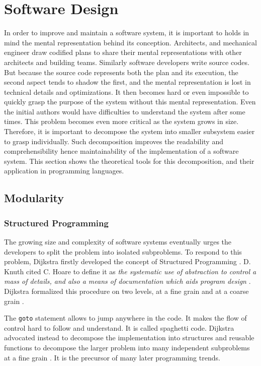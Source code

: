 \section{Software Design} \label{chapter3:software-design}

In order to improve and maintain a software system, it is important to holds in mind the mental representation behind its conception.
Architects, and mechanical engineer draw codified plans to share their mental representations with other architects and building teams.
Similarly software developers write source codes.
But because the source code represents both the plan and its execution, the second aspect tends to shadow the first, and the mental representation is lost in technical details and optimizations.
It then becomes hard or even impossible to quickly grasp the purpose of the system without this mental representation.
Even the initial authors would have difficulties to understand the system after some times.
This problem becomes even more critical as the system grows in size.
Therefore, it is important to decompose the system into smaller subsystem easier to grasp individually.
Such decomposition improves the readability and comprehensibility hence maintainability of the implementation of a software system.
This section shows the theoretical tools for this decomposition, and their application in programming languages.

\subsection{Modularity}

\subsubsection{Structured Programming}


The growing size and complexity of software systems eventually urges the developers to split the problem into isolated subproblems.
To respond to this problem, Dijkstra firstly developed the concept of Structured Programming \cite{Dijkstra1970}.
D. Knuth cited C. Hoare to define it as \textit{the systematic use of abstraction to control a mass of details, and also a means of documentation which aids program design} \cite{Knuth1974}.
Dijkstra formalized this procedure on two levels, at a fine grain and at a coarse grain \cite{Dijkstra1968a,Dijkstra1968}.

The \texttt{goto} statement allows to jump anywhere in the code.
It makes the flow of control hard to follow and understand.
It is called spaghetti code.
Dijkstra advocated instead to decompose the implementation into structures and reusable functions to decompose the larger problem into many independent subproblems at a fine grain \cite{Dijkstra1968a}.
It is the precursor of many later programming trends.


